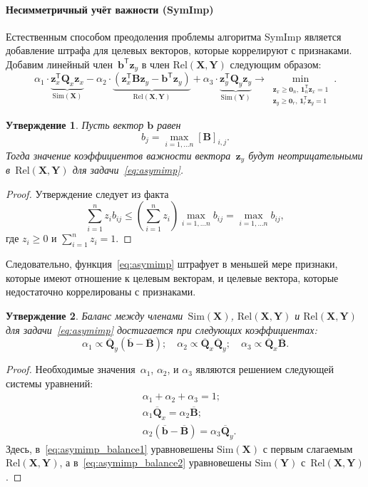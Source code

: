 \documentclass[preprint,12pt]{elsarticle}
\newtheorem{proposition}{Утверждение}
\theoremstyle{definition}
\newcommand{\bz}{\mathbf{z}}
\newcommand{\bb}{\mathbf{b}}
\newcommand{\bY}{\mathbf{Y}}
\newcommand{\bX}{\mathbf{X}}
\newcommand{\bB}{\mathbf{B}}
\newcommand{\bQ}{\mathbf{Q}}
\newcommand{\T}{\mathsf{T}}
\newcommand{\bOne}{\boldsymbol{1}}
\newcommand{\bZero}{\boldsymbol{0}}
\begin{document}
\paragraph{Несимметричный учёт важности (SymImp)}
Естественным способом преодоления проблемы алгоритма SymImp является добавление штрафа для целевых векторов, которые коррелируют с признаками.
Добавим линейный член~$\bb^{\T} \bz_y$ в член $\text{Rel}(\bX, \bY)$ следующим образом:
\begin{equation}
\alpha_1 \cdot \underbrace{\bz_x^{\T} \bQ_x \bz_x}_{\text{Sim}(\bX)} - \alpha_2 \cdot  \underbrace{\left(\bz_x^{\T} \bB \bz_y - \bb^{\T} \bz_y \right) }_{\text{Rel}(\bX, \bY)} + \alpha_3 \cdot \underbrace{\bz_y^{\T} \bQ_y \bz_y}_{\text{Sim}(\bY)} \rightarrow \min_{\substack{\bz_x \geq \bZero_n, \, \bOne_n^{\T}\bz_x=1 \\ \bz_y \geq \bZero_r, \, \bOne_r^{\T}\bz_y=1}}.
\label{eq:asymimp}
\end{equation}
\begin{proposition}
	Пусть вектор $\bb$ равен
	\begin{equation*}
	b_j = \max_{i=1, \dots n} [\bB]_{i, j}.
	\end{equation*}
	Тогда значение коэффициентов важности вектора~$\bz_y$ будут неотрицательными в~$\text{Rel}(\bX, \bY)$ для задачи~\eqref{eq:asymimp}.
\end{proposition}
\begin{proof}
    Утверждение следует из факта
	\[
	\sum_{i=1}^n  z_i b_{ij} \leq \left(\sum_{i=1}^n z_i \right)\max_{i=1, \dots n} b_{ij} = \max_{i=1, \dots n} b_{ij},
	\]
	где $z_i \geq 0$ и $\sum_{i=1}^n z_i = 1$.
\end{proof}
Следовательно, функция~\eqref{eq:asymimp} штрафует в меньшей мере признаки, которые имеют отношение к целевым векторам, и целевые вектора, которые недостаточно коррелированы с признаками.
\begin{proposition}
    Баланс между членами~$\text{Sim}(\bX)$, $\text{Rel}(\bX, \bY)$ и $\text{Rel}(\bX, \bY)$ для задачи~\eqref{eq:asymimp} достигается при следующих коэффициентах:
	\begin{equation*}
	\alpha_1 \propto \overline{\bQ}_y \left( \overline{\bb} - \overline{\bB}\right); \quad
	\alpha_2 \propto \overline{\bQ}_x \overline{\bQ}_y; \quad
	\alpha_3  \propto \overline{\bQ}_x \overline{\bB}.
	\end{equation*}
\end{proposition}
\begin{proof}
    Необходимые значения~$\alpha_1$, $\alpha_2$, и $\alpha_3$ являются решением следующей системы уравнений:
	\begin{align}
	&\alpha_1 + \alpha_2 + \alpha_3 = 1; \\
	&\alpha_1 \overline{\bQ}_x = \alpha_2 \overline{\bB}; \label{eq:asymimp_balance1}\\
	&\alpha_2 \left(\overline{\bb} - \overline{\bB} \right) = \alpha_3 \overline{\bQ}_y.
	\label{eq:asymimp_balance2}
	\end{align}
	Здесь, в~\eqref{eq:asymimp_balance1} уравновешены $\text{Sim}(\bX)$ с первым слагаемым~$\text{Rel}(\bX, \bY)$, а в~\eqref{eq:asymimp_balance2} уравновешены $\text{Sim}(\bY)$  с~$\text{Rel}(\bX, \bY)$.
\end{proof}
\end{document}
